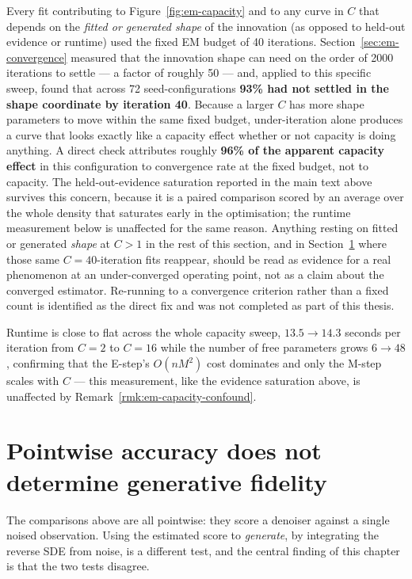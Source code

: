\begin{remark}\label{rmk:em-capacity-confound}
Every fit contributing to Figure~\ref{fig:em-capacity} and to any curve in
$C$ that depends on the \emph{fitted or generated shape} of the innovation
(as opposed to held-out evidence or runtime) used the fixed EM budget of 40
iterations. Section~\ref{sec:em-convergence} measured that the innovation
shape can need on the order of 2000 iterations to settle --- a factor of
roughly 50 --- and, applied to this specific sweep, found that across 72
seed-configurations \textbf{93\% had not settled in the shape coordinate by
iteration 40}. Because a larger $C$ has more shape parameters to move within
the same fixed budget, under-iteration alone produces a curve that looks
exactly like a capacity effect whether or not capacity is doing anything. A
direct check attributes roughly \textbf{96\% of the apparent capacity effect}
in this configuration to convergence rate at the fixed budget, not to
capacity. The held-out-evidence saturation reported in the main text above
survives this concern, because it is a paired comparison scored by an
average over the whole density that saturates early in the optimisation; the
runtime measurement below is unaffected for the same reason. Anything
resting on fitted or generated \emph{shape} at $C>1$ in the rest of this
section, and in Section~\ref{sec:em-generative} where those same $C=40$-iteration
fits reappear, should be read as evidence for a real phenomenon at an
under-converged operating point, not as a claim about the converged
estimator. Re-running to a convergence criterion rather than a fixed count is
identified as the direct fix and was not completed as part of this thesis.
\end{remark}

Runtime is close to flat across the whole capacity sweep, $13.5\to14.3$
seconds per iteration from $C=2$ to $C=16$ while the number of free
parameters grows $6\to48$, confirming that the E-step's $O(nM^2)$ cost
dominates and only the M-step scales with $C$ --- this measurement, like the
evidence saturation above, is unaffected by
Remark~\ref{rmk:em-capacity-confound}.

\section{Pointwise accuracy does not determine generative fidelity}
\label{sec:em-generative}

The comparisons above are all pointwise: they score a denoiser against a
single noised observation. Using the estimated score to \emph{generate},
by integrating the reverse SDE from noise, is a different test, and the
central finding of this chapter is that the two tests disagree.

